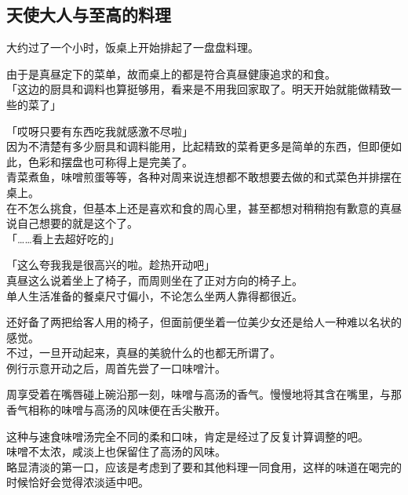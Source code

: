 \subsection{天使大人与至高的料理}

大约过了一个小时，饭桌上开始排起了一盘盘料理。

由于是真昼定下的菜单，故而桌上的都是符合真昼健康追求的和食。\\

「这边的厨具和调料也算挺够用，看来是不用我回家取了。明天开始就能做精致一些的菜了」

「哎呀只要有东西吃我就感激不尽啦」\\

因为不清楚有多少厨具和调料能用，比起精致的菜肴更多是简单的东西，但即便如此，色彩和摆盘也可称得上是完美了。\\

青菜煮鱼，味噌煎蛋等等，各种对周来说连想都不敢想要去做的和式菜色并排摆在桌上。\\

在不怎么挑食，但基本上还是喜欢和食的周心里，甚至都想对稍稍抱有歉意的真昼说自己想要的就是这个了。\\

「……看上去超好吃的」

「这么夸我我是很高兴的啦。趁热开动吧」\\

真昼这么说着坐上了椅子，而周则坐在了正对方向的椅子上。\\

单人生活准备的餐桌尺寸偏小，不论怎么坐两人靠得都很近。

还好备了两把给客人用的椅子，但面前便坐着一位美少女还是给人一种难以名状的感觉。\\

不过，一旦开动起来，真昼的美貌什么的也都无所谓了。\\

例行示意开动之后，周首先尝了一口味噌汁。

周享受着在嘴唇碰上碗沿那一刻，味噌与高汤的香气。慢慢地将其含在嘴里，与那香气相称的味噌与高汤的风味便在舌尖散开。

这种与速食味噌汤完全不同的柔和口味，肯定是经过了反复计算调整的吧。\\

味噌不太浓，咸淡上也保留住了高汤的风味。\\

略显清淡的第一口，应该是考虑到了要和其他料理一同食用，这样的味道在喝完的时候恰好会觉得浓淡适中吧。\\

